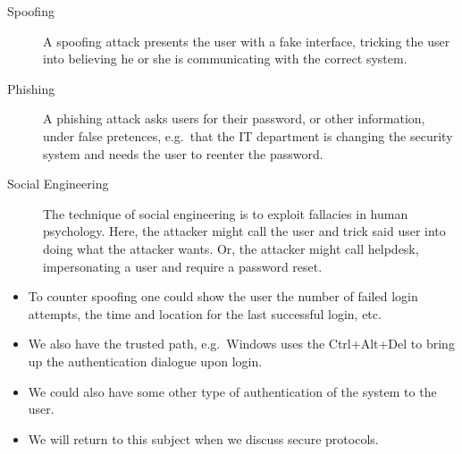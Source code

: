 \documentclass{beamer}
\begin{document}
\begin{frame}{\insertsubsectionhead}
  \begin{description}
    \item[Spoofing] A spoofing attack presents the user with a fake interface, 
      tricking the user into believing he or she is communicating with the 
      correct system.

    \item[Phishing] A phishing attack asks users for their password, or other 
      information, under false pretences, e.g.\ that the IT department is 
      changing the security system and needs the user to reenter the password.

    \item[Social Engineering] The technique of social engineering is to exploit 
      fallacies in human psychology.
      Here, the attacker might call the user and trick said user into doing 
      what the attacker wants.
      Or, the attacker might call helpdesk, impersonating a user and require 
      a password reset.
  \end{description}
\end{frame}

\begin{frame}{\insertsubsectionhead}
  \begin{itemize}
    \item To counter spoofing one could show the user the number of failed 
      login attempts, the time and location for the last successful login, etc.

    \item We also have the trusted path, e.g.\ Windows uses the Ctrl+Alt+Del to 
      bring up the authentication dialogue upon login.

    \item We could also have some other type of authentication of the system to 
      the user.

    \item We will return to this subject when we discuss secure protocols.

  \end{itemize}
\end{frame}
\end{document}
